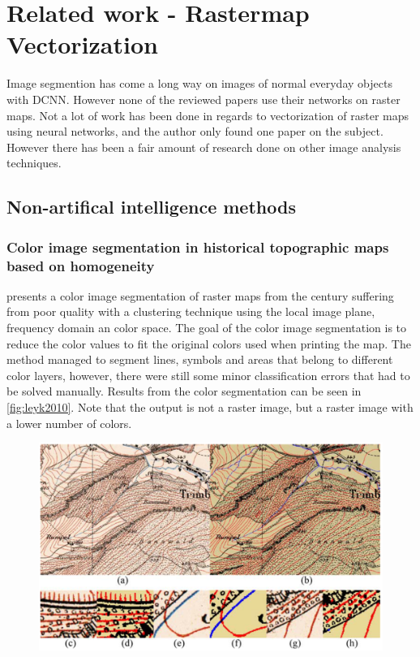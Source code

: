 \chapter{Related work - Rastermap Vectorization}
Image segmention has come a long way on images of normal everyday objects with DCNN. However none of the reviewed papers use their networks on raster maps. Not a lot of work has been done in regards to vectorization of raster maps using neural networks, and the author only found one paper on the subject. However there has been a fair amount of research done on other image analysis techniques.

\section{Non-artifical intelligence methods}

\subsection{Color image segmentation in historical topographic maps based on homogeneity}
\citet{Leyk2010} presents a color image segmentation of raster maps from the  century suffering from poor quality with a clustering technique using the local image plane, frequency domain an color space. The goal of the color image segmentation is to reduce the color values to fit the original colors used when printing the map. The method managed to segment lines, symbols and areas that belong to different color layers, however, there were still some minor classification errors that had to be solved manually. Results from the color segmentation can be seen in \autoref{fig:leyk2010}. Note that the output is not a raster image, but a raster image with a lower number of colors.

\begin{figure}[H]
	\centering
	\includegraphics[width=0.8\linewidth]{fig/leyk2010.png}
	\label{fig:leyk2010}
\end{figure}


